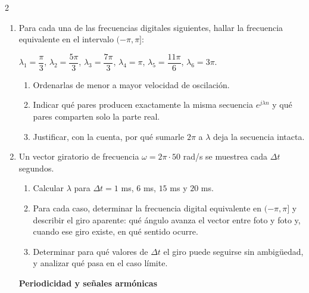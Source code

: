 \documentclass[10pt,a4paper]{article}
\begin{document}
\begin{multicols}{2}
\begin{enumerate}
		\item Para cada una de las frecuencias digitales siguientes, hallar la
		frecuencia equivalente en el intervalo $(-\pi,\pi]$:
		\begin{center}
		$\lambda_1 = \dfrac{\pi}{3}$, \quad
		$\lambda_2 = \dfrac{5\pi}{3}$, \quad
		$\lambda_3 = \dfrac{7\pi}{3}$, \quad
		$\lambda_4 = \pi$, \quad
		$\lambda_5 = \dfrac{11\pi}{6}$, \quad
		$\lambda_6 = 3\pi$.
		\end{center}
		\begin{enumerate}
			\item Ordenarlas de menor a mayor velocidad de oscilación.
			\item Indicar qué pares producen exactamente la misma secuencia
			$e^{j\lambda n}$ y qué pares comparten solo la parte real.
			\item Justificar, con la cuenta, por qué sumarle $2\pi$ a $\lambda$
			deja la secuencia intacta.
		\end{enumerate}

		\item Un vector giratorio de frecuencia $\omega = 2\pi\cdot 50$ rad/s se
		muestrea cada $\Delta t$ segundos.
		\begin{enumerate}
			\item Calcular $\lambda$ para $\Delta t = 1$ ms, $6$ ms, $15$ ms y
			$20$ ms.
			\item Para cada caso, determinar la frecuencia digital equivalente
			en $(-\pi,\pi]$ y describir el giro aparente: qué ángulo avanza el
			vector entre foto y foto y, cuando ese giro existe, en qué sentido
			ocurre.
			\item Determinar para qué valores de $\Delta t$ el giro puede
			seguirse sin ambigüedad, y analizar qué pasa en el caso límite.
		\end{enumerate}

		\textbf{Periodicidad y señales armónicas}


\end{enumerate}
\end{multicols}
\end{document}
